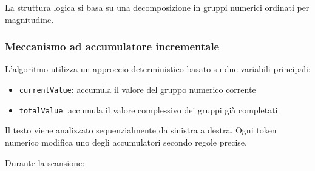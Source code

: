 La struttura logica si basa su una decomposizione in gruppi numerici ordinati per magnitudine.

\subsubsection{Meccanismo ad accumulatore incrementale}

L'algoritmo utilizza un approccio deterministico basato su due variabili principali:

\begin{itemize}
    \item \texttt{currentValue}: accumula il valore del gruppo numerico corrente
    \item \texttt{totalValue}: accumula il valore complessivo dei gruppi già completati
\end{itemize}

Il testo viene analizzato sequenzialmente da sinistra a destra. Ogni token numerico modifica uno degli accumulatori secondo regole precise.

Durante la scansione:

